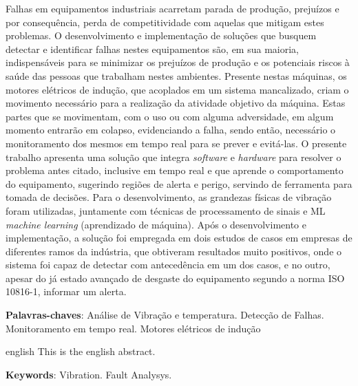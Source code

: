 \setlength{\absparsep}{18pt} %
\begin{resumo}

Falhas em equipamentos industriais acarretam parada de produção, prejuízos e por consequência, perda de competitividade com aquelas que 
mitigam estes problemas. O desenvolvimento e implementação de soluções que busquem detectar e identificar falhas nestes equipamentos são, 
em sua maioria, indispensáveis para se minimizar os prejuízos de produção e os potenciais riscos à saúde das pessoas que trabalham nestes ambientes. 
Presente nestas máquinas, os motores elétricos de indução, que acoplados em um sistema mancalizado, criam o movimento necessário para a
realização da atividade objetivo da máquina. Estas partes que se movimentam, com o uso ou com alguma adversidade, em algum momento entrarão em 
colapso, evidenciando a falha, sendo então, necessário o monitoramento dos mesmos em tempo real para se prever e evitá-las.
O presente trabalho apresenta uma solução que integra \textit{software} e \textit{hardware} para resolver o problema antes citado, inclusive em tempo real e que 
aprende o comportamento do equipamento, sugerindo regiões de alerta e perigo, servindo de ferramenta para tomada de decisões.
Para o desenvolvimento, as grandezas físicas de vibração foram utilizadas, juntamente com técnicas de processamento de sinais e 
ML \textit{machine learning} (aprendizado de máquina). 
Após o desenvolvimento e implementação, a solução foi empregada em dois estudos de casos em empresas de diferentes ramos da indústria, que 
obtiveram resultados muito positivos, onde o sistema foi capaz de detectar com antecedência em um dos casos, e no outro, apesar do já estado 
avançado de desgaste do equipamento segundo a norma ISO 10816-1, informar um alerta.
  
	\vspace{\onelineskip}
	
	\noindent 
	\textbf{Palavras-chaves}: Análise de Vibração e temperatura. Detecção de Falhas. Monitoramento em tempo real. Motores elétricos de indução
\end{resumo}

\begin{resumo}[Abstract]
 \begin{otherlanguage*}{english}
   This is the english abstract.
   \lipsum[7]
   \vspace{\onelineskip}
 
   \noindent 
   \textbf{Keywords}: Vibration. Fault Analysys.
 \end{otherlanguage*}
\end{resumo}
